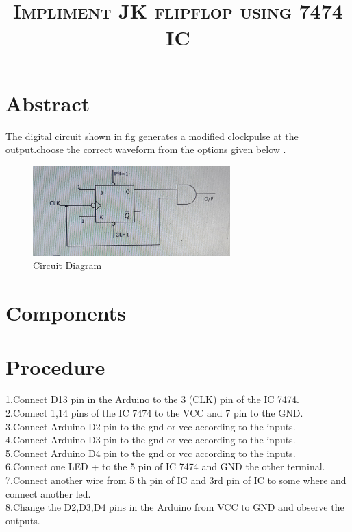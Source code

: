 \documentclass[jornal,10pt,twocolumn]{article}
\title{\textbf{\textsc{Impliment JK flipflop using 7474 IC }}}
\author{\textit{\teflipflopxtbf{Bana Prathyusha}}}
\begin{document}
\section{Abstract}
The digital circuit shown in fig generates a modified clockpulse at the output.choose the correct waveform from the options given below .


\begin{figure}[h]
	\centering
	\includegraphics[width=3in]{dia.jpg}
	\caption{Circuit Diagram}

\end{figure}
\section{Components}
\begin{table}[ht]
\caption{}
\label{Tabel-1}
\end{table}
\section{Procedure}
1.Connect D13 pin in the Arduino to the 3 (CLK) pin of the IC 7474.
\\
2.Connect 1,14  pins of the IC 7474 to the VCC and 7 pin to the GND.
\\
3.Connect  Arduino D2 pin to the gnd or vcc according to the inputs.
\\
4.Connect Arduino D3 pin to the gnd or vcc according to the inputs.
\\
5.Connect Arduino D4 pin to the gnd or vcc according to the inputs.
\\
6.Connect one LED + to the 5 pin of IC 7474 and GND the other terminal.
\\
7.Connect another wire from 5 th pin of IC and 3rd pin of IC to some where and connect another led.\\
8.Change the D2,D3,D4 pins in the Arduino  from VCC to GND and observe the outputs.
\\
\end{document}
